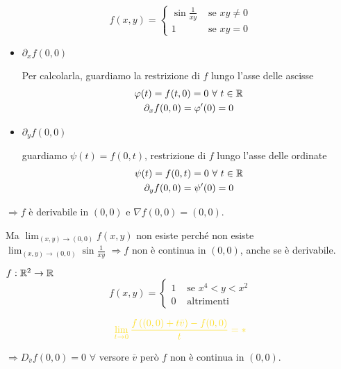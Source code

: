 \begin{exbar}
\begin{example}
	\begin{equation*}
		f(x,y)=
		\begin{cases}
			\sin\frac{1}{xy}&\text{  se  }xy\neq0
			\\
			1& \text{  se  }xy=0
		\end{cases}
	\end{equation*}
	
	\begin{itemize} 
		\item $\partial_{x}f(0,0)$
		
		Per calcolarla, guardiamo la restrizione di $f$ lungo l'asse delle ascisse
		\begin{gather*}
			\varphi(t)=f(t,0)=0\,\,\forall\,\,t\in\mathbb{R}
			\\
			\partial_xf(0,0)=\varphi'(0)=0
		\end{gather*}
		
		\item $\partial_yf(0,0)$
		
		guardiamo $\psi(t)=f(0,t)$, restrizione di $f$ lungo l'asse delle ordinate
		\begin{gather*}
			\psi(t)=f(0,t)=0\,\,\forall\,\, t \in \mathbb{R}
	 		\\
			\partial_yf(0,0)=\psi'(0)=0
		\end{gather*}
	\end{itemize}
	
	$\Rightarrow f$ è derivabile in $(0,0)$ e $\nabla f(0,0)=(0,0)$. 
	
	Ma $\lim_{(x,y)\rightarrow(0,0)}f(x,y)$ non esiste perché non esiste $\lim_{(x,y)\rightarrow(0,0)}\sin\frac{1}{xy}$ $\Rightarrow f$ non è continua in $(0,0)$, anche se è derivabile.  
\end{example}
\end{exbar}


\begin{exbar}
	{$f:\mathbb{R}^2\rightarrow\mathbb{R}$
		\begin{equation*}
			f(x,y)=
			\begin{cases}
				1&\text{  se  }x^4<y<x^2
				\\
				0 &\text{  altrimenti}
			\end{cases}
		\end{equation*}
		
		$${\color{Goldenrod} \lim_{t\to0} \frac{f\left( (0,0) + t\bar{v} \right) - f(0,0)}{t} = *}$$
		
		$\Rightarrow D_{\overline{v}}f(0,0)=0\,\,\forall$ versore $\overline{v}$ però $f$ non è continua in $(0,0)$.}
\end{exbar}


